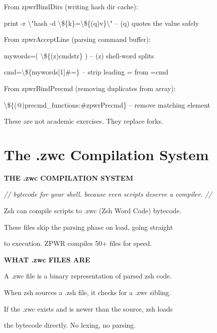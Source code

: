 \documentclass[11pt,a4paper,twoside]{book}
\begin{document}
From zpwrBindDirs (writing hash dir cache):

print -r \textbackslash{}"hash -d \textbackslash{}\$\{k\}=\textbackslash{}\$\{(q)v\}\textbackslash{}"  -- (q) quotes the value safely

From zpwrAcceptLine (parsing command buffer):

mywords=( \textbackslash{}\$\{(z)cmdstr\} )           -- (z) shell-word splits

cmd=\textbackslash{}\$\{mywords[1]\#=\}                -- strip leading = from =cmd

From zpwrBindPrecmd (removing duplicates from array):

\begin{codebox}
\textbackslash{}\$\{(@)precmd\_functions:\#zpwrPrecmd\}  -- remove matching element\\
\end{codebox}

These are not academic exercises. They replace forks.


\vspace{16pt}

\section{The .zwc Compilation System}


\vspace{10pt}
{\large\bfseries\color{neoncyan} THE .zwc COMPILATION SYSTEM}\vspace{6pt}

{\small\itshape\color{dimtext} // bytecode for your shell. because even scripts deserve a compiler. //}

Zsh can compile scripts to .zwc (Zsh Word Code) bytecode.

These files skip the parsing phase on load, going straight

to execution. ZPWR compiles 50+ files for speed.


\vspace{12pt}
{\bfseries\color{neonyellow} WHAT .zwc FILES ARE}\vspace{4pt}

A .zwc file is a binary representation of parsed zsh code.

When zsh sources a .zsh file, it checks for a .zwc sibling.

If the .zwc exists and is newer than the source, zsh loads

the bytecode directly. No lexing, no parsing.
\end{document}
